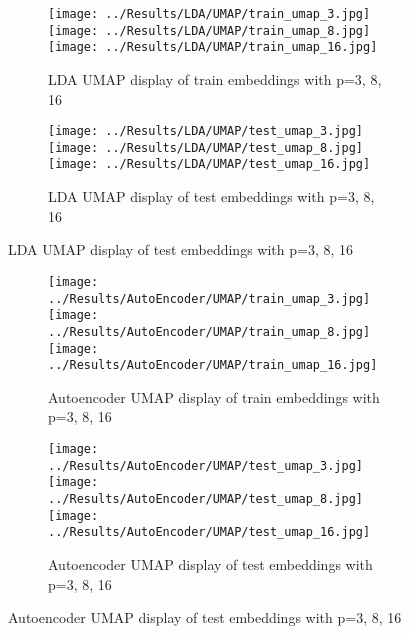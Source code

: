 \documentclass{article}
\begin{document}
\begin{figure}[H]
    \centering
    \begin{subfigure}{\linewidth}
        \centering
        \texttt{[image: ../Results/LDA/UMAP/train\_umap\_3.jpg]}
        \texttt{[image: ../Results/LDA/UMAP/train\_umap\_8.jpg]}
        \texttt{[image: ../Results/LDA/UMAP/train\_umap\_16.jpg]}
        \caption{LDA UMAP display of train embeddings with p=3, 8, 16}
    \end{subfigure}
    \begin{subfigure}{\linewidth}
        \centering
        \texttt{[image: ../Results/LDA/UMAP/test\_umap\_3.jpg]}
        \texttt{[image: ../Results/LDA/UMAP/test\_umap\_8.jpg]}
        \texttt{[image: ../Results/LDA/UMAP/test\_umap\_16.jpg]}
        \caption{LDA UMAP display of test embeddings with p=3, 8, 16}
    \end{subfigure}
\end{figure}

\begin{figure}[H]
    \centering
    \begin{subfigure}{\linewidth}
        \centering
        \texttt{[image: ../Results/AutoEncoder/UMAP/train\_umap\_3.jpg]}
        \texttt{[image: ../Results/AutoEncoder/UMAP/train\_umap\_8.jpg]}
        \texttt{[image: ../Results/AutoEncoder/UMAP/train\_umap\_16.jpg]}
        \caption{Autoencoder UMAP display of train embeddings with p=3, 8, 16}
    \end{subfigure}
    \begin{subfigure}{\linewidth}
        \centering
        \texttt{[image: ../Results/AutoEncoder/UMAP/test\_umap\_3.jpg]}
        \texttt{[image: ../Results/AutoEncoder/UMAP/test\_umap\_8.jpg]}
        \texttt{[image: ../Results/AutoEncoder/UMAP/test\_umap\_16.jpg]}
        \caption{Autoencoder UMAP display of test embeddings with p=3, 8, 16}
    \end{subfigure}
\end{figure}
\end{document}
